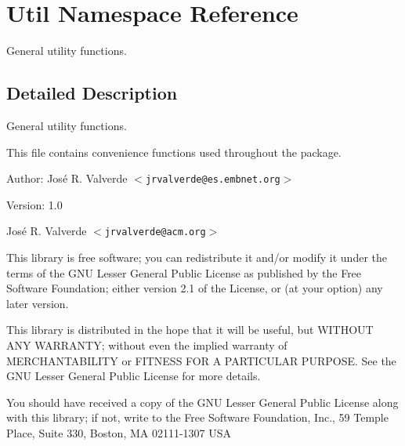 \section{Util Namespace Reference}
\label{namespaceUtil}
General utility functions.  




\subsection{Detailed Description}
General utility functions. 

This file contains convenience functions used throughout the package.

\begin{Desc}
\item[Author:]Jos\'{e} R. Valverde $<${\tt jrvalverde@es.embnet.org}$>$ \end{Desc}
\begin{Desc}
\item[Version:]1.0\end{Desc}
Jos\'{e} R. Valverde $<${\tt jrvalverde@acm.org}$>$

This library is free software; you can redistribute it and/or modify it under the terms of the GNU Lesser General Public License as published by the Free Software Foundation; either version 2.1 of the License, or (at your option) any later version.

This library is distributed in the hope that it will be useful, but WITHOUT ANY WARRANTY; without even the implied warranty of MERCHANTABILITY or FITNESS FOR A PARTICULAR PURPOSE. See the GNU Lesser General Public License for more details.

You should have received a copy of the GNU Lesser General Public License along with this library; if not, write to the Free Software Foundation, Inc., 59 Temple Place, Suite 330, Boston, MA 02111-1307 USA 

